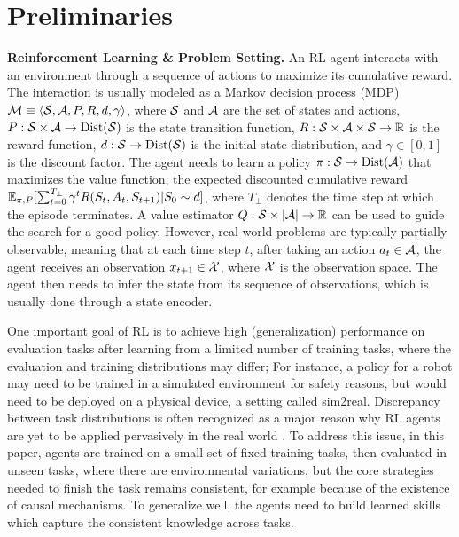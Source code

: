 \section{Preliminaries}
\label{sec:preliminary}


\textbf{Reinforcement Learning \& Problem Setting.} An RL agent interacts with an environment through a sequence of actions to maximize its cumulative reward. The interaction is usually modeled as a Markov decision process (MDP) $\mathcal{M} \equiv \langle \mathcal{S}, \mathcal{A}, P, R, d, \gamma \rangle$, where $\mathcal{S}$ and $\mathcal{A}$ are the set of states and actions, $P: \mathcal{S} \times \mathcal{A} \to \text{Dist}(\mathcal{S})$ is the state transition function, $R: \mathcal{S} \times \mathcal{A} \times \mathcal{S} \to \mathbb{R}$ is the reward function, $d: \mathcal{S} \to \text{Dist}(\mathcal{S})$ is the initial state distribution, and $\gamma \in [0, 1]$ is the discount factor. The agent needs to learn a policy $\pi: \mathcal{S} \to \text{Dist}(\mathcal{A})$ that maximizes the value function, \ie{} the expected discounted cumulative reward $\mathbb{E}_{\pi, P} [\sum_{t=0}^{T_\perp} \gamma^t R(S_t, A_t, S_{t+1}) | S_0 \sim d]$, where $T_\perp$ denotes the time step at which the episode terminates. A value estimator $Q: \mathcal{S} \times {|\mathcal{A}|} \to \mathbb{R}$ can be used to guide the search for a good policy. However, real-world problems are typically partially observable, meaning that at each time step $t$, after taking an action $a_t \in \mathcal{A}$, the agent receives an observation $x_{t+1} \in \mathcal{X}$, where $\mathcal{X}$ is the observation space. The agent then needs to infer the state from its sequence of observations, which is usually done through a state encoder.  %

One important goal of RL is to achieve high (generalization) performance on evaluation tasks after learning from a limited number of training tasks, where the evaluation and training distributions may differ; For instance, a policy for a robot may need to be trained in a simulated environment for safety reasons, but would need to be deployed on a physical device, a setting called sim2real. Discrepancy between task distributions is often recognized as a major reason why RL agents are yet to be applied pervasively in the real world  \citep{igl2019generalization}. To address this issue, in this paper,  agents are trained on a small set of fixed training tasks, then evaluated in unseen tasks, where there are environmental variations, but the core strategies needed to finish the task remains consistent, for example because of the existence of causal mechanisms. To generalize well, the agents need to build learned skills which capture the consistent knowledge across tasks.


